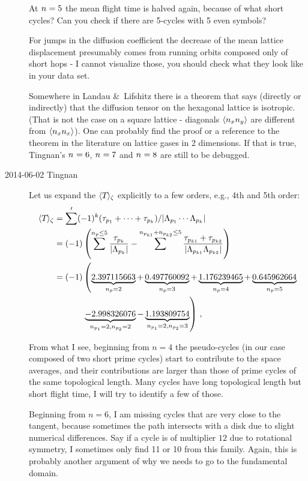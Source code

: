 \begin{description}
At ${n_{}}=5$  the mean flight time is halved again, because of
what short cycles? Can you check if there are 5-cycles with 5 even symbols?

For jumps in the diffusion coefficient the decrease of the mean
lattice displacement presumably comes from running orbits composed
only of short hops - I cannot visualize those, you should check what they look
like in your data set.

Somewhere in Landau \&\ Lifshitz there is a theorem that says (directly
or indirectly) that the diffusion tensor on the hexagonal lattice is
isotropic. (That is not the case on a square lattice - diagonals
$\langle {n_{x}n_{y}} \rangle$ are different from $\langle {n_{x}n_{x}} \rangle$).
One can probably find the proof or a reference to the theorem in the
literature on lattice gases in 2 dimensions. If that is true, Tingnan's
${n_{}}=6$, ${n_{}}=7$ and ${n_{}}=8$ are still to be debugged.


\item[2014-06-02 Tingnan]
Let us expand the $\langle {{\ensuremath{T_{}}}} \rangle_\zeta$ explicitly to a few
orders, e.g., 4th and 5th order:
\begin{align*}
\spaceAver{\period{}}_\zeta
  &=\sum^{\prime}(-1)^{k}(\tau_{p_1}+\cdots+\tau_{p_k})/\vert\ExpaEig_{p_1}\cdots\ExpaEig_{p_k}\vert\\
  &=(-1)\left(\sum^{n_p\leq5}\frac{\tau_{p_k}}{\vert\ExpaEig_{p_k}\vert} - \sum^{n_{p_{k1}}+n_{p_{k2}}\leq5}\frac{\tau_{p_{k1}}+\tau_{p_{k2}}}{\vert\ExpaEig_{p_{k1}}\ExpaEig_{p_{k2}}\vert} \right)\\
  &=(-1)\left(\underbrace{2.397115663}_{n_p=2} + \underbrace{0.497760092}_{n_p=3} + \underbrace{1.176239465}_{n_p=4} + \underbrace{0.645962664}_{n_p=5}\right.\\
  &\phantom{{}=(-1)}\left.\underbrace{-2.998326076}_{n_{p_1}=2,n_{p_2}=2} - \underbrace{1.193809754}_{n_{p_1}=2,n_{p_2}=3}\right)
\,,
\end{align*}

From what I see, beginning from $n=4$ the pseudo-cycles (in our case
composed of two short prime cycles) start to contribute to the space
averages, and their contributions are larger than those of prime cycles
of the same topological length. Many cycles have long topological length
but short flight time, I will try to identify a few of those.

Beginning from $n=6$, I am missing cycles that are very close to the
tangent, because sometimes the path intersects with a disk due to slight
numerical differences. Say if a cycle is of multiplier $12$ due to
rotational symmetry, I sometimes only find 11 or 10 from this family.
Again, this is probably another argument of why we needs to go to the
fundamental domain.


\end{description}
